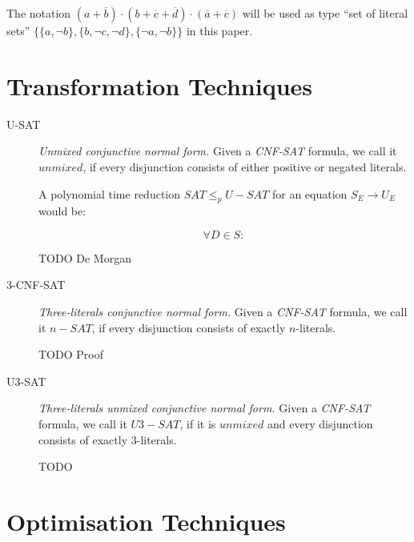 \documentclass[12pt, letterpaper]{article}
\begin{document}
\begin{description}
{            The notation $(a+\overline b) \cdot (b +\overline c +
            \overline d) \cdot (\overline a +\overline c)$ will be used as 
            type ``set of literal sets'' $\{\{a, \lnot b\}, \{b, \lnot c,
            \lnot d\}, \{\lnot a, \lnot b\}\}$ in this paper.
        }
    \end{description}

    \section{Transformation Techniques}

    \begin{description}
        \item[U-SAT] {
            \emph{Unmixed conjunctive normal form.} Given a
            \emph{CNF-SAT} formula, we call it $unmixed$, if
            every disjunction consists of either positive or 
            negated literals.

            A polynomial time reduction $SAT \leq_p U-SAT$
            for an equation $S_E \rightarrow U_E$ would be:

            \[\forall D \in S:\]

            TODO De Morgan
        }
        \item[3-CNF-SAT] {
            \emph{Three-literals conjunctive normal form.} Given a
            \emph{CNF-SAT} formula, we call it $n-SAT$, if
            every disjunction consists of exactly $n$-literals.
            
            TODO Proof
        }
        \item[U3-SAT] {
            \emph{Three-literals unmixed conjunctive normal form.}
            Given a \emph{CNF-SAT} formula, we call it $U3-SAT$, if
            it is $unmixed$ and every disjunction consists of
            exactly $3$-literals.
            
            TODO 
        }
    \end{description}

    \section{Optimisation Techniques}
\end{document}
